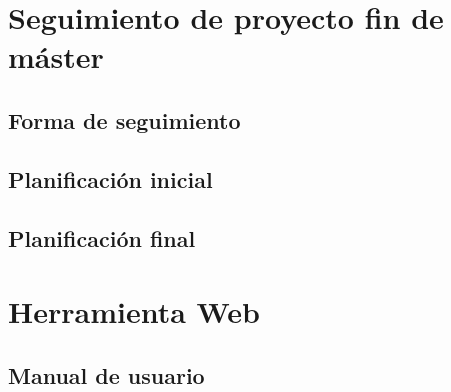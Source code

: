 \documentclass[12pt,a4paper,onecolumn,oneside]{report}
\begin{document}
\chapter{Seguimiento de proyecto fin de máster}
\label{Seguimiento de proyecto fin de máster}


\section{Forma de seguimiento}

\section{Planificación inicial}

\section{Planificación final}

\chapter{Herramienta Web}
\section{Manual de usuario}
\end{document}
